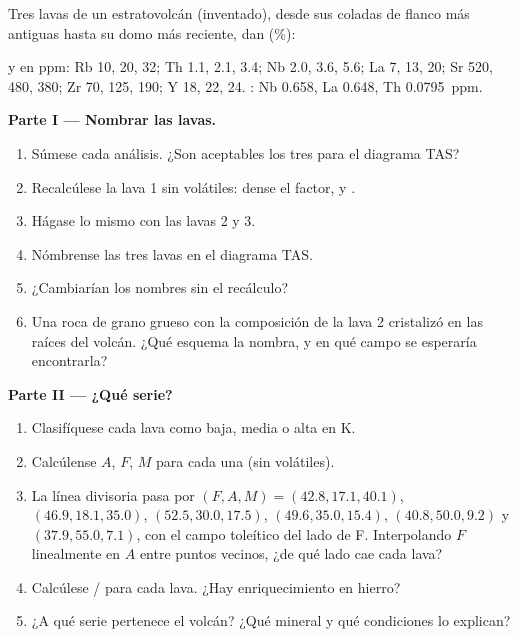 \begin{problem}
\label{pb:b2:magmatic-series:1}
Tres lavas de un estratovolcán (inventado), desde sus coladas de flanco más antiguas hasta su domo
más reciente, dan (\unit{\percent}):

\smallskip{}

\smallskip\noindent y en ppm: Rb 10, 20, 32; Th 1.1, 2.1, 3.4; Nb 2.0, 3.6, 5.6;
La 7, 13, 20; Sr 520, 480, 380; Zr 70, 125, 190; Y 18, 22, 24. : Nb
0.658, La 0.648, Th \qty{0.0795}{ppm}.

\noindent\textbf{Parte I --- Nombrar las lavas.}
\begin{enumerate}
\item Súmese cada análisis. ¿Son aceptables los tres para el diagrama TAS?
\item Recalcúlese la lava 1 sin volátiles: dense el factor,  y
.
\item Hágase lo mismo con las lavas 2 y 3.
\item Nómbrense las tres lavas en el diagrama TAS.
\item ¿Cambiarían los nombres sin el recálculo?
\item Una roca de grano grueso con la composición de la lava 2 cristalizó en las raíces del
volcán. ¿Qué esquema la nombra, y en qué campo se esperaría encontrarla?
\end{enumerate}

\noindent\textbf{Parte II --- ¿Qué serie?}
\begin{enumerate}[resume]
\item Clasifíquese cada lava como baja, media o alta en K.
\item Calcúlense $A$, $F$, $M$ para cada una (sin volátiles).
\item La línea divisoria pasa por $(F, A, M) = (42.8, 17.1, 40.1)$, $(46.9, 18.1,
35.0)$, $(52.5, 30.0, 17.5)$, $(49.6, 35.0, 15.4)$, $(40.8, 50.0, 9.2)$ y $(37.9,
55.0, 7.1)$, con el campo toleítico del lado de F. Interpolando $F$ linealmente en
$A$ entre puntos vecinos, ¿de qué lado cae cada lava?
\item Calcúlese / para cada lava. ¿Hay enriquecimiento en hierro?
\item ¿A qué serie pertenece el volcán? ¿Qué mineral y qué condiciones
lo explican?
\end{enumerate}


\end{problem}
